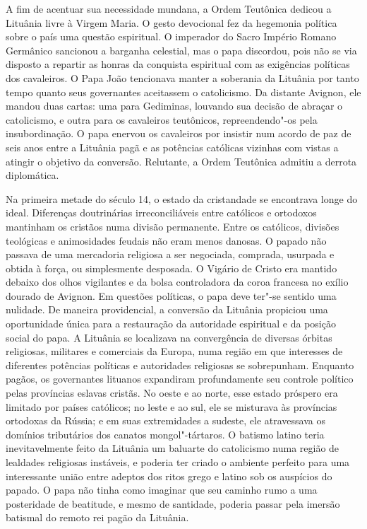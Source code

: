 A fim de acentuar sua necessidade mundana, a Ordem Teutônica dedicou a
Lituânia livre à Virgem Maria. O gesto devocional fez da hegemonia
política sobre o país uma questão espiritual. O imperador do Sacro
Império Romano Germânico sancionou a barganha celestial, mas o papa
discordou, pois não se via disposto a repartir as honras da conquista
espiritual com as exigências políticas dos cavaleiros. O Papa João 
tencionava manter a soberania da Lituânia por tanto tempo quanto seus
governantes aceitassem o catolicismo. Da distante Avignon, ele mandou
duas cartas: uma para Gediminas, louvando sua decisão de abraçar o
catolicismo, e outra para os cavaleiros teutônicos, repreendendo"-os pela
insubordinação. O papa enervou os cavaleiros por insistir num acordo de
paz de seis anos entre a Lituânia pagã e as potências católicas vizinhas
com vistas a atingir o objetivo da conversão. Relutante, a Ordem
Teutônica admitiu a derrota diplomática.

Na primeira metade do século 14, o estado da cristandade se encontrava
longe do ideal. Diferenças doutrinárias irreconciliáveis entre católicos
e ortodoxos mantinham os cristãos numa divisão permanente. Entre os
católicos, divisões teológicas e animosidades feudais não eram menos
danosas. O papado não passava de uma mercadoria religiosa a ser
negociada, comprada, usurpada e obtida à força, ou simplesmente
desposada. O Vigário de Cristo era mantido debaixo dos olhos vigilantes
e da bolsa controladora da coroa francesa no exílio dourado de Avignon.
Em questões políticas, o papa deve ter"-se sentido uma nulidade. De
maneira providencial, a conversão da Lituânia propiciou uma oportunidade
única para a restauração da autoridade espiritual e da posição social do
papa. A Lituânia se localizava na convergência de diversas órbitas
religiosas, militares e comerciais da Europa, numa região em que
interesses de diferentes potências políticas e autoridades religiosas se
sobrepunham. Enquanto pagãos, os governantes lituanos expandiram
profundamente seu controle político pelas províncias eslavas cristãs. No
oeste e ao norte, esse estado próspero era limitado por países
católicos; no leste e ao sul, ele se misturava às províncias ortodoxas
da Rússia; e em suas extremidades a sudeste, ele atravessava os domínios
tributários dos canatos mongol"-tártaros. O batismo latino teria
inevitavelmente feito da Lituânia um baluarte do catolicismo numa região
de lealdades religiosas instáveis, e poderia ter criado o ambiente
perfeito para uma interessante união entre adeptos dos ritos grego e
latino sob os auspícios do papado. O papa não tinha como imaginar que
seu caminho rumo a uma posteridade de beatitude, e mesmo de santidade,
poderia passar pela imersão batismal do remoto rei pagão da Lituânia.

